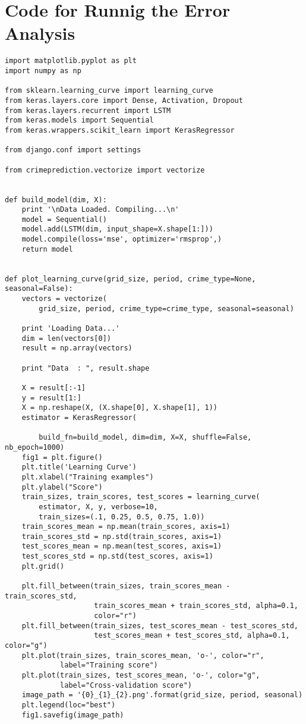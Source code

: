 \chapter{Code for Runnig the Error Analysis} \label{code-error-analysis}
\begin{small}
\begin{verbatim}
import matplotlib.pyplot as plt
import numpy as np

from sklearn.learning_curve import learning_curve
from keras.layers.core import Dense, Activation, Dropout
from keras.layers.recurrent import LSTM
from keras.models import Sequential
from keras.wrappers.scikit_learn import KerasRegressor

from django.conf import settings

from crimeprediction.vectorize import vectorize


def build_model(dim, X):
    print '\nData Loaded. Compiling...\n'
    model = Sequential()
    model.add(LSTM(dim, input_shape=X.shape[1:]))
    model.compile(loss='mse', optimizer='rmsprop',)
    return model


def plot_learning_curve(grid_size, period, crime_type=None, seasonal=False):
    vectors = vectorize(
        grid_size, period, crime_type=crime_type, seasonal=seasonal)

    print 'Loading Data...'
    dim = len(vectors[0])
    result = np.array(vectors)

    print "Data  : ", result.shape

    X = result[:-1]
    y = result[1:]
    X = np.reshape(X, (X.shape[0], X.shape[1], 1))
    estimator = KerasRegressor(

        build_fn=build_model, dim=dim, X=X, shuffle=False, nb_epoch=1000)
    fig1 = plt.figure()
    plt.title('Learning Curve')
    plt.xlabel("Training examples")
    plt.ylabel("Score")
    train_sizes, train_scores, test_scores = learning_curve(
        estimator, X, y, verbose=10,
        train_sizes=(.1, 0.25, 0.5, 0.75, 1.0))
    train_scores_mean = np.mean(train_scores, axis=1)
    train_scores_std = np.std(train_scores, axis=1)
    test_scores_mean = np.mean(test_scores, axis=1)
    test_scores_std = np.std(test_scores, axis=1)
    plt.grid()

    plt.fill_between(train_sizes, train_scores_mean - train_scores_std,
                     train_scores_mean + train_scores_std, alpha=0.1,
                     color="r")
    plt.fill_between(train_sizes, test_scores_mean - test_scores_std,
                     test_scores_mean + test_scores_std, alpha=0.1, color="g")
    plt.plot(train_sizes, train_scores_mean, 'o-', color="r",
             label="Training score")
    plt.plot(train_sizes, test_scores_mean, 'o-', color="g",
             label="Cross-validation score")
    image_path = '{0}_{1}_{2}.png'.format(grid_size, period, seasonal)
    plt.legend(loc="best")
    fig1.savefig(image_path)
\end{verbatim}
\end{small}